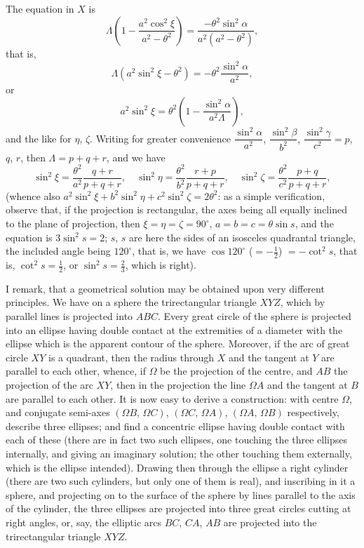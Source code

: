 \documentclass[11pt,a4paper]{article}
\theoremstyle{plain}
\theoremstyle{definition}
\theoremstyle{remark}
\begin{document}
The equation in $X$ is
\[
\Lambda\left(1 - \frac{a^2\cos^2\xi}{a^2-\theta^2}\right) = \frac{-\theta^2\sin^2\alpha}{a^2(a^2-\theta^2)},
\]
that is,
\[
\Lambda(a^2\sin^2\xi - \theta^2) = -\theta^2\frac{\sin^2\alpha}{a^2},
\]
or
\[
a^2\sin^2\xi = \theta^2\left(1 - \frac{\sin^2\alpha}{a^2\Lambda}\right),
\]
and the like for $\eta$, $\zeta$. Writing for greater convenience $\dfrac{\sin^2\alpha}{a^2}$, $\dfrac{\sin^2\beta}{b^2}$, $\dfrac{\sin^2\gamma}{c^2} = p$, $q$, $r$, then $\Lambda = p+q+r$, and we have
\[
\sin^2\xi = \frac{\theta^2}{a^2}\frac{q+r}{p+q+r},\quad \sin^2\eta = \frac{\theta^2}{b^2}\frac{r+p}{p+q+r},\quad \sin^2\zeta = \frac{\theta^2}{c^2}\frac{p+q}{p+q+r},
\]
(whence also $a^2\sin^2\xi + b^2\sin^2\eta + c^2\sin^2\zeta = 2\theta^2$: as a simple verification, observe that, if the projection is rectangular, the axes being all equally inclined to the plane of projection, then $\xi = \eta = \zeta = 90^\circ$, $a = b = c = \theta\sin s$, and the equation is $3\sin^2 s = 2$; $s$, $s$ are here the sides of an isosceles quadrantal triangle, the included angle being $120^\circ$, that is, we have $\cos 120^\circ$ ($= -\tfrac{1}{2}$) $= -\cot^2 s$, that is, $\cot^2 s = \tfrac{1}{2}$, or $\sin^2 s = \tfrac{2}{3}$, which is right).

I remark, that a geometrical solution may be obtained upon very different principles. We have on a sphere the trirectangular triangle $XYZ$, which by parallel lines is projected into $ABC$. Every great circle of the sphere is projected into an ellipse having double contact at the extremities of a diameter with the ellipse which is the apparent contour of the sphere. Moreover, if the arc of great circle $XY$ is a quadrant, then the radius through $X$ and the tangent at $Y$ are parallel to each other, whence, if $\Omega$ be the projection of the centre, and $AB$ the projection of the arc $XY$, then in the projection the line $\Omega A$ and the tangent at $B$ are parallel to each other. It is now easy to derive a construction: with centre $\Omega$, and conjugate semi-axes $(\Omega B,\, \Omega C)$, $(\Omega C,\, \Omega A)$, $(\Omega A,\, \Omega B)$ respectively, describe three ellipses; and find a concentric ellipse having double contact with each of these (there are in fact two such ellipses, one touching the three ellipses internally, and giving an imaginary solution; the other touching them externally, which is the ellipse intended). Drawing then through the ellipse a right cylinder (there are two such cylinders, but only one of them is real), and inscribing in it a sphere, and projecting on to the surface of the sphere by lines parallel to the axis of the cylinder, the three ellipses are projected into three great circles cutting at right angles, or, say, the elliptic arcs $BC$, $CA$, $AB$ are projected into the trirectangular triangle $XYZ$.
\end{document}
